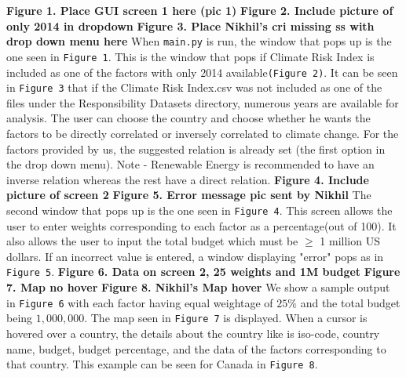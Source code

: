 \documentclass[fontsize=11pt]{article}
\begin{document}
    \textbf{Figure 1. Place GUI  screen 1 here (pic 1)}\newline
    \textbf{Figure 2. Include picture of only 2014 in dropdown}\newline
    \textbf{Figure 3. Place Nikhil's cri missing ss with drop down menu here}\newline
    When \texttt{main.py} is run, the window that pops up is the one seen in \texttt{Figure 1}. This is the window that pops if Climate Risk Index
    is included as one of the factors with only 2014 available\texttt{(Figure 2)}. It can be seen in \texttt{Figure 3} that if the Climate Risk Index.csv was not included as one of the files
    under the Responsibility Datasets directory, numerous years are available for analysis.\newline
    The user can choose the country and choose whether he wants the factors to be directly correlated or inversely correlated
    to climate change. For the factors provided by us, the suggested relation is already set (the first option in the drop down
    menu).\newline
    Note - Renewable Energy is recommended to have an inverse relation whereas the rest have a direct relation.\newline
    \textbf{Figure 4. Include picture of screen 2}\newline
    \textbf{Figure 5. Error message pic sent by Nikhil}\newline
    The second window that pops up is the one seen in \texttt{Figure 4}. This screen allows the user to enter weights corresponding to
    each factor as a percentage(out of 100). It also allows the user to input the total budget which must be $\geq$ 1 million US
    dollars. If an incorrect value is entered, a window displaying "error" pops as in \texttt{Figure 5}.\newline
    \textbf{Figure 6. Data on screen 2,  25 weights and 1M budget}\newline
    \textbf{Figure 7. Map no hover}\newline
    \textbf{Figure 8. Nikhil's Map hover}\newline
    We show a sample output in \texttt{Figure 6} with each factor having equal weightage of $25\%$ and the total budget
    being $1,000,000$. The map seen in \texttt{Figure 7} is displayed. When a cursor is hovered over a country, the details about
    the country like is iso-code, country name, budget, budget percentage, and the data of the factors corresponding to that
    country. This example can be seen for Canada in \texttt{Figure 8}.\newline
\end{document}
